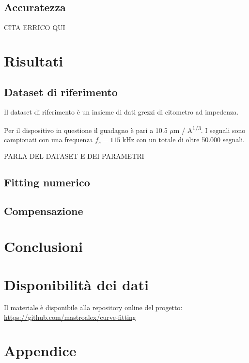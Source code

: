 \subsection{Accuratezza}



CITA ERRICO QUI

\section{Risultati}

\subsection{Dataset di riferimento}

Il dataset di riferimento è un insieme di dati grezzi di citometro ad impedenza.  

Per il dispositivo in questione il guadagno è pari a 10.5 $\mu$m / A\textsuperscript{1/3}. I segnali sono campionati con una frequenza $f_s=115$ kHz con un totale di oltre 50.000 segnali.


PARLA DEL DATASET E DEI PARAMETRI 

\subsection{Fitting numerico}



\subsection{Compensazione}


\section{Conclusioni}


\section*{Disponibilità dei dati}

Il materiale è disponibile alla repository online del progetto: \url{https://github.com/mastroalex/curve-fitting}


\raggedbottom
\printbibliography[title=Riferimenti]


\clearpage
\onecolumn
\section*{Appendice}
